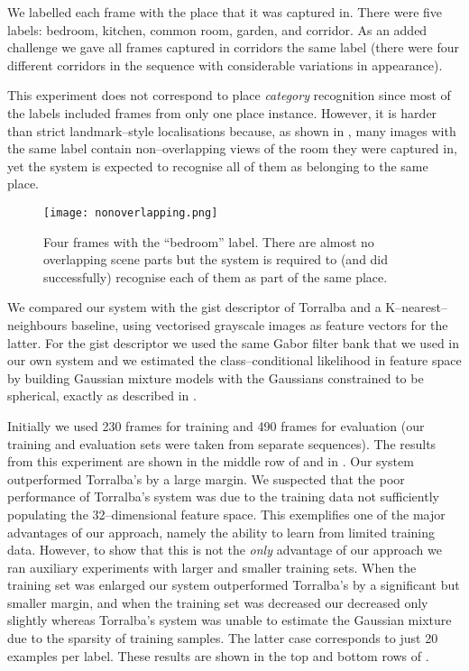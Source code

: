 We labelled each frame with the place that it was captured in. There
were five labels: bedroom, kitchen, common room, garden, and
corridor. As an added challenge we gave all frames captured in
corridors the same label (there were four different corridors in the
sequence with considerable variations in appearance).

This experiment does not correspond to place {\em category}
recognition since most of the labels included frames from only one
place instance. However, it is harder than strict landmark--style
localisations because, as shown in , many images
with the same label contain non--overlapping views of the room they
were captured in, yet the system is expected to recognise all of them
as belonging to the same place.

\begin{figure}[htp]
\centering
\texttt{[image: nonoverlapping.png]}
\caption{Four frames with the ``bedroom'' label. There are almost no
  overlapping scene parts but the system is required to (and did
  successfully) recognise each of them as part of the same place.}
\label{fig:nonoverlapping}
\end{figure}

We compared our system with the gist descriptor of Torralba \etal and
a K--nearest--neighbours baseline, using vectorised grayscale images
as feature vectors for the latter. For the gist descriptor we used the
same Gabor filter bank that we used in our own system and we estimated
the class--conditional likelihood in feature space by building
Gaussian mixture models with the Gaussians constrained to be
spherical, exactly as described in \cite{Torralba03}.

Initially we used 230 frames for training and 490 frames for
evaluation (our training and evaluation sets were taken from separate
sequences). The results from this experiment are shown in the middle
row of  and in
. Our system outperformed Torralba's by a
large margin. We suspected that the poor performance of Torralba's
system was due to the training data not sufficiently populating the
32--dimensional feature space. This exemplifies one of the major
advantages of our approach, namely the ability to learn from limited
training data. However, to show that this is not the \textit{only}
advantage of our approach we ran auxiliary experiments with larger and
smaller training sets. When the training set was enlarged our system
outperformed Torralba's by a significant but smaller margin, and when
the training set was decreased our decreased only slightly whereas
Torralba's system was unable to estimate the Gaussian mixture due to
the sparsity of training samples. The latter case corresponds to just
20 examples per label. These results are shown in the top and bottom
rows of .

